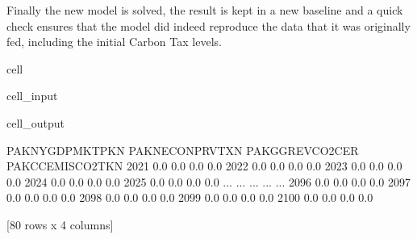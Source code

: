 \documentclass[letterpaper,10pt,english]{jupyterBook}
\begin{document}
\sphinxAtStartPar
Finally the new model is solved, the result is kept in a new baseline and a quick check ensures that the model did indeed reproduce the data that it was originally fed, including the initial Carbon Tax levels.

\begin{sphinxuseclass}{cell}\begin{sphinxVerbatimInput}

\begin{sphinxuseclass}{cell_input}
\begin{sphinxVerbatim}[commandchars=\\\{\}]
   

\PYG{p}{[}\PYG{p}{]}
\end{sphinxVerbatim}

\end{sphinxuseclass}\end{sphinxVerbatimInput}
\begin{sphinxVerbatimOutput}

\begin{sphinxuseclass}{cell_output}
\begin{sphinxVerbatim}[commandchars=\\\{\}]
      PAKNYGDPMKTPKN  PAKNECONPRVTXN  PAKGGREVCO2CER  PAKCCEMISCO2TKN
2021             0.0             0.0            \PYGZhy{}0.0              0.0
2022             0.0             0.0            \PYGZhy{}0.0              0.0
2023             0.0             0.0            \PYGZhy{}0.0              0.0
2024             0.0             0.0            \PYGZhy{}0.0              0.0
2025             0.0             0.0            \PYGZhy{}0.0              0.0
...              ...             ...             ...              ...
2096             0.0             0.0            \PYGZhy{}0.0              0.0
2097             0.0             0.0            \PYGZhy{}0.0              0.0
2098             0.0             0.0            \PYGZhy{}0.0              0.0
2099             0.0             0.0            \PYGZhy{}0.0              0.0
2100             0.0             0.0            \PYGZhy{}0.0              0.0

[80 rows x 4 columns]
\end{sphinxVerbatim}

\end{sphinxuseclass}\end{sphinxVerbatimOutput}

\end{sphinxuseclass}
\end{document}
